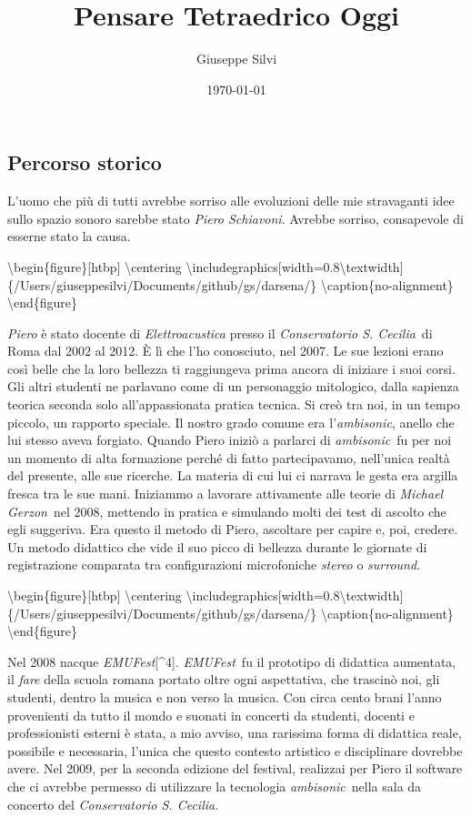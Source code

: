 \documentclass[a4paper,11pt]{article}
\title{Pensare Tetraedrico Oggi}
\author{Giuseppe Silvi}
\date{\today}
\begin{document}
\maketitle

\subsection{Percorso storico}\hypertarget{percorso-storico}{}\label{percorso-storico}

L'uomo che più di tutti avrebbe sorriso alle evoluzioni delle mie
stravaganti idee sullo spazio sonoro sarebbe stato \emph{Piero Schiavoni}.
Avrebbe sorriso, consapevole di esserne stato la causa.

\textbackslash{}begin\{figure\}{[}htbp{]}
  \textbackslash{}centering
  \textbackslash{}includegraphics{[}width=0.8\textbackslash{}textwidth{]}\{/Users/giuseppesilvi/Documents/github/gs/darsena/\}
  \textbackslash{}caption\{no-alignment\}
\textbackslash{}end\{figure\}

\emph{Piero} è stato docente di \emph{Elettroacustica} presso il \emph{Conservatorio S.
Cecilia} di Roma dal 2002 al 2012. È lì che l'ho conosciuto, nel 2007.
Le sue lezioni erano così belle che la loro bellezza ti raggiungeva
prima ancora di iniziare i suoi corsi. Gli altri studenti ne parlavano
come di un personaggio mitologico, dalla sapienza teorica seconda solo
all'appassionata pratica tecnica. Si creò tra noi, in un tempo piccolo,
un rapporto speciale. Il nostro grado comune era l'\emph{ambisonic}, anello
che lui stesso aveva forgiato. Quando Piero iniziò a parlarci di
\emph{ambisonic} fu per noi un momento di alta formazione perché di fatto
partecipavamo, nell'unica realtà del presente, alle sue ricerche. La
materia di cui lui ci narrava le gesta era argilla fresca tra le sue
mani. Iniziammo a lavorare attivamente alle teorie di \emph{Michael
Gerzon} nel 2008, mettendo in pratica e simulando molti dei test di
ascolto che egli suggeriva. Era questo il metodo di Piero, ascoltare per
capire e, poi, credere. Un metodo didattico che vide il suo picco di
bellezza durante le giornate di registrazione comparata tra
configurazioni microfoniche \emph{stereo} o \emph{surround}.

\textbackslash{}begin\{figure\}{[}htbp{]}
  \textbackslash{}centering
  \textbackslash{}includegraphics{[}width=0.8\textbackslash{}textwidth{]}\{/Users/giuseppesilvi/Documents/github/gs/darsena/\}
  \textbackslash{}caption\{no-alignment\}
\textbackslash{}end\{figure\}

Nel 2008 nacque \emph{EMUFest}{[}\^{}4{]}. \emph{EMUFest} fu il prototipo di didattica
aumentata, il \emph{fare} della scuola romana portato oltre ogni aspettativa,
che trascinò noi, gli studenti, dentro la musica e non verso la musica.
Con circa cento brani l'anno provenienti da tutto il mondo e suonati in
concerti da studenti, docenti e professionisti esterni è stata, a mio
avviso, una rarissima forma di didattica reale, possibile e necessaria,
l'unica che questo contesto artistico e disciplinare dovrebbe avere. Nel
2009, per la seconda edizione del festival, realizzai per Piero il
software che ci avrebbe permesso di utilizzare la tecnologia
\emph{ambisonic} nella sala da concerto del \emph{Conservatorio S. Cecilia}.
\end{document}
